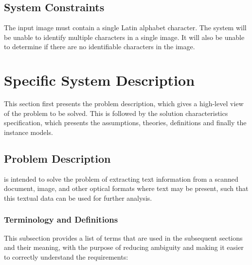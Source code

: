 \documentclass[12pt]{article}
\begin{document}
\subsection{System Constraints}

The input image must contain a single Latin alphabet character. The system
will be unable to identify multiple characters in a single image. It will also
be unable to determine if there are no identifiable characters in the image.

\section{Specific System Description}

This section first presents the problem description, which gives a high-level
view of the problem to be solved.  This is followed by the solution
characteristics specification, which presents the assumptions, theories,
definitions and finally the instance models.


\subsection{Problem Description} \label{Sec_pd}

\progname{} is intended to solve the problem of extracting text information from
a scanned document, image, and other optical formats where text may be present,
such that this textual data can be used for further analysis.

\subsubsection{Terminology and  Definitions}


This subsection provides a list of terms that are used in the subsequent
sections and their meaning, with the purpose of reducing ambiguity and making it
easier to correctly understand the requirements:
\end{document}
